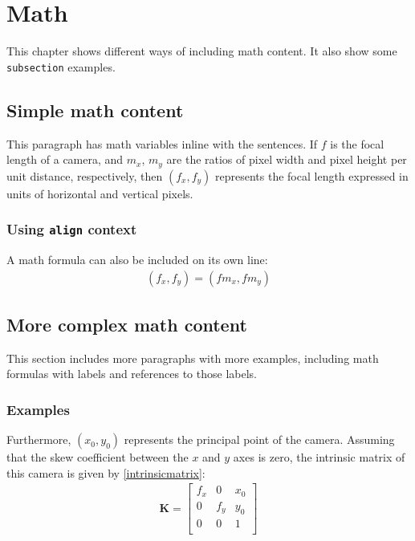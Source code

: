 \chapter{Math} \label{math}

This chapter shows different ways of including math content. It also show some \texttt{subsection} examples.

\section{Simple math content}

This paragraph has math variables inline with the sentences. If $f$ is the focal length of a camera,
and $m_x$, $m_y$ are the ratios of pixel width and pixel height per unit distance, respectively, then 
$(f_x, f_y)$ represents the focal length expressed in units of 
horizontal and vertical pixels.

\subsection{Using \texttt{align} context}

A math formula can also be included on its own line:
\begin{align}
(f_x, f_y) = ( f m_x , f m_y)
\end{align}

\section{More complex math content}

This section includes more paragraphs with more examples, including math formulas with labels and
references to those labels.

\subsection{Examples}

Furthermore, $(x_0, y_0)$ represents the principal point of the camera. Assuming that the skew coefficient 
between the $x$ and $y$ axes is zero, the intrinsic matrix of this camera is given by \ref{intrinsicmatrix}:
\begin{align} \label{intrinsicmatrix}
\mathbf{K} = \begin{bmatrix}
	f_x & 0    & x_0 \\
	0    & f_y & y_0 \\
	0    & 0    & 1      \\
\end{bmatrix}
\end{align}

